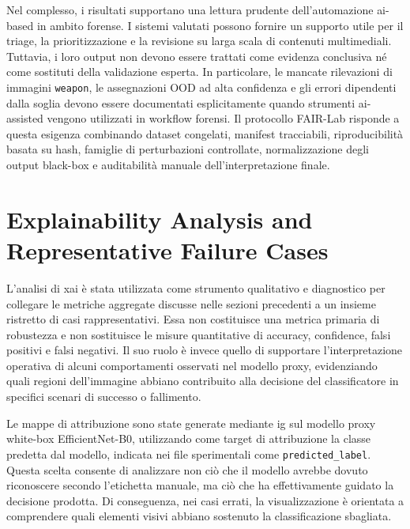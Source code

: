 Nel complesso, i risultati supportano una lettura prudente dell'automazione
\gls{ai}-based in ambito forense. I sistemi valutati possono fornire un supporto
utile per il triage, la prioritizzazione e la revisione su larga scala di
contenuti multimediali. Tuttavia, i loro output non devono essere trattati come
evidenza conclusiva né come sostituti della validazione esperta. In particolare,
le mancate rilevazioni di immagini \texttt{weapon}, le assegnazioni OOD ad alta
confidenza e gli errori dipendenti dalla soglia devono essere documentati
esplicitamente quando strumenti \gls{ai}-assisted vengono utilizzati in workflow
forensi. Il protocollo FAIR-Lab risponde a questa esigenza combinando dataset
congelati, manifest tracciabili, riproducibilità basata su hash, famiglie di
perturbazioni controllate, normalizzazione degli output black-box e auditabilità
manuale dell'interpretazione finale.


\section{Explainability Analysis and Representative Failure Cases}
\label{sec:results-xai}

L'analisi di \gls{xai} è stata utilizzata come strumento qualitativo e
diagnostico per collegare le metriche aggregate discusse nelle sezioni
precedenti a un insieme ristretto di casi rappresentativi. Essa non costituisce
una metrica primaria di robustezza e non sostituisce le misure quantitative di
accuracy, confidence, falsi positivi e falsi negativi. Il suo ruolo è invece
quello di supportare l'interpretazione operativa di alcuni comportamenti
osservati nel modello proxy, evidenziando quali regioni dell'immagine abbiano
contribuito alla decisione del classificatore in specifici scenari di successo o
fallimento.

Le mappe di attribuzione sono state generate mediante \gls{ig} sul modello proxy
white-box EfficientNet-B0, utilizzando come target di attribuzione la classe
predetta dal modello, indicata nei file sperimentali come
\texttt{predicted\_label}. Questa scelta consente di analizzare non ciò che il
modello avrebbe dovuto riconoscere secondo l'etichetta manuale, ma ciò che ha
effettivamente guidato la decisione prodotta. Di conseguenza, nei casi errati,
la visualizzazione è orientata a comprendere quali elementi visivi abbiano
sostenuto la classificazione sbagliata.

